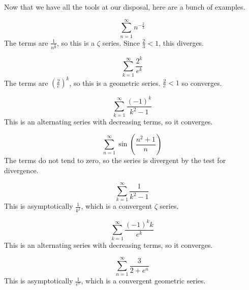 \documentclass[fleqn,letterpaper]{report}
\begin{document}
Now that we have all the tools at our disposal, here are a
bunch of examples.

\begin{example}
\begin{equation*}
\sum_{n=1}^\infty n^{-\frac{2}{3}}
\end{equation*}
The terms are $\frac{1}{n^{\frac{2}{3}}}$, so this is a
$\zeta$ series. Since $\frac{2}{3} < 1$, this diverges.
\end{example}

\begin{example}
\begin{equation*}
\sum_{k=1}^\infty \frac{2^k}{e^k}
\end{equation*}
The terms are $\left( \frac{2}{e} \right)^k$, so this is a
geometric series. $\frac{2}{e} < 1$ so converges.
\end{example}

\begin{example}
\begin{equation*}
\sum_{k=1}^\infty \frac{(-1)^k}{k^2-1}
\end{equation*}
This is an alternating series with decreasing terms, so it
converges.
\end{example}

\begin{example}
\begin{equation*}
\sum_{n=1}^\infty \sin \left( \frac{n^2+1}{n} \right)
\end{equation*}
The terms do not tend to zero, so the series is divergent by
the test for divergence.
\end{example}

\begin{example}
\begin{equation*}
\sum_{k=1}^\infty \frac{1}{k^2-1}
\end{equation*}
This is asymptotically $\frac{1}{k^2}$, which is a convergent
$\zeta$ series.
\end{example}

\begin{example}
\begin{equation*}
\sum_{k=1}^\infty \frac{(-1)^k k}{e^k}
\end{equation*}
This is an alternating series with decreasing terms, so it
converges.
\end{example}

\begin{example}
\begin{equation*}
\sum_{n=1}^\infty \frac{3}{2 + e^n}
\end{equation*}
This is asymptotically $\frac{1}{e^n}$, which is a convergent
geometric series.
\end{example}
\end{document}

